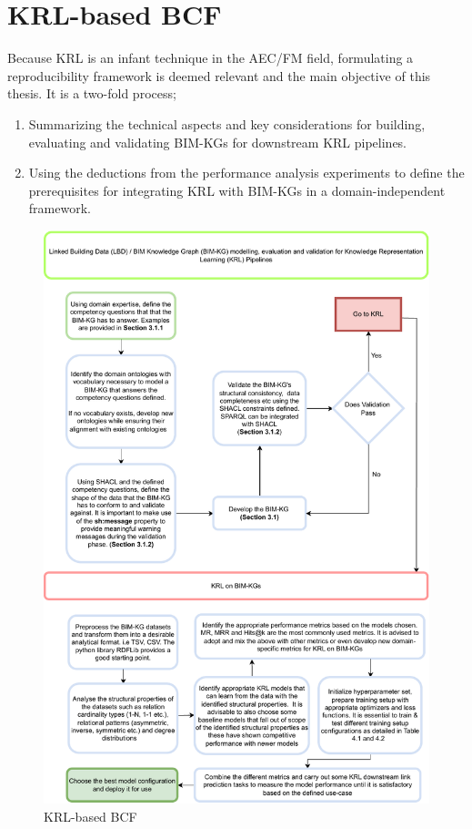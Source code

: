 \section{\acf{KRL-based BCF}}
\label{KRL-based BCF}
Because \ac{KRL} is an infant technique in the \ac{AEC/FM} field, formulating a reproducibility framework is deemed relevant and the main objective of this thesis. It is a two-fold process;
\begin{enumerate}
    \item 
    Summarizing the technical aspects and key considerations for building, evaluating and validating \acp{BIM-KG} for downstream \ac{KRL} pipelines.

    \item 
    Using the deductions from the performance analysis experiments to define the prerequisites for integrating \ac{KRL} with \acp{BIM-KG} in a domain-independent framework.   
\end{enumerate}
\begin{figure}[!t]
        \centering
        \includegraphics[width=1\textwidth]{figures/LBD-KRL Framework.pdf}
        \caption{KRL-based BCF}\label{KRL-based BCF Chart}
    \end{figure}


